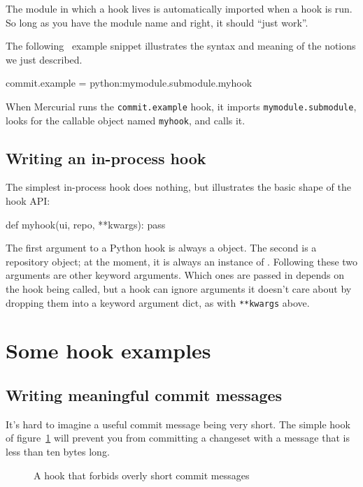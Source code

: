 The module in which a hook lives is automatically imported when a hook
is run.  So long as you have the module name and 
right, it should ``just work''.

The following \hgrc\ example snippet illustrates the syntax and
meaning of the notions we just described.
\begin{codesample2}
  [hooks]
  commit.example = python:mymodule.submodule.myhook
\end{codesample2}
When Mercurial runs the \texttt{commit.example} hook, it imports
\texttt{mymodule.submodule}, looks for the callable object named
\texttt{myhook}, and calls it.

\subsection{Writing an in-process hook}

The simplest in-process hook does nothing, but illustrates the basic
shape of the hook API:
\begin{codesample2}
  def myhook(ui, repo, **kwargs):
      pass
\end{codesample2}
The first argument to a Python hook is always a
 object.  The second is a repository object;
at the moment, it is always an instance of
.  Following these two
arguments are other keyword arguments.  Which ones are passed in
depends on the hook being called, but a hook can ignore arguments it
doesn't care about by dropping them into a keyword argument dict, as
with \texttt{**kwargs} above.

\section{Some hook examples}

\subsection{Writing meaningful commit messages}

It's hard to imagine a useful commit message being very short.  The
simple  hook of figure~\ref{ex:hook:msglen.go}
will prevent you from committing a changeset with a message that is
less than ten bytes long.

\begin{figure}[ht]
  \caption{A hook that forbids overly short commit messages}
  \label{ex:hook:msglen.go}
\end{figure}


